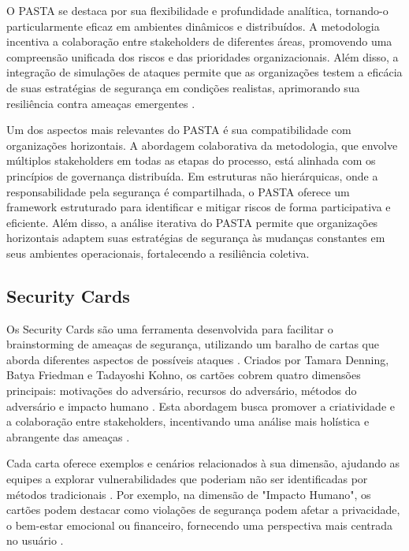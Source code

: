 O PASTA se destaca por sua flexibilidade e profundidade analítica,
tornando-o particularmente eficaz em ambientes dinâmicos e
distribuídos. A metodologia incentiva a colaboração entre stakeholders
de diferentes áreas, promovendo uma compreensão unificada dos riscos e
das prioridades organizacionais. Além disso, a integração de
simulações de ataques permite que as organizações testem a eficácia de
suas estratégias de segurança em condições realistas, aprimorando sua
resiliência contra ameaças emergentes
\cite{RiskCentricThreatModeling}.

Um dos aspectos mais relevantes do PASTA é sua compatibilidade com
organizações horizontais. A abordagem colaborativa da metodologia, que
envolve múltiplos stakeholders em todas as etapas do processo, está
alinhada com os princípios de governança distribuída. Em estruturas
não hierárquicas, onde a responsabilidade pela segurança é
compartilhada, o PASTA oferece um framework estruturado para
identificar e mitigar riscos de forma participativa e eficiente. Além
disso, a análise iterativa do PASTA permite que organizações
horizontais adaptem suas estratégias de segurança às mudanças
constantes em seus ambientes operacionais, fortalecendo a resiliência
coletiva.

\subsection{Security Cards}
\label{subsec:security_cards}

Os Security Cards são uma ferramenta desenvolvida para facilitar o
brainstorming de ameaças de segurança, utilizando um baralho de cartas
que aborda diferentes aspectos de possíveis ataques
\cite{SecurityCardsToolkit}. Criados por Tamara Denning, Batya
Friedman e Tadayoshi Kohno, os cartões cobrem quatro dimensões
principais: motivações do adversário, recursos do adversário, métodos
do adversário e impacto humano \cite{KeepingAheadofOurAdversaries}.
Esta abordagem busca promover a criatividade e a colaboração entre
stakeholders, incentivando uma análise mais holística e abrangente das
ameaças \cite{CyberThreatModeling}.

Cada carta oferece exemplos e cenários relacionados à sua dimensão,
ajudando as equipes a explorar vulnerabilidades que poderiam não ser
identificadas por métodos tradicionais \cite{SecurityCardsToolkit}.
Por exemplo, na dimensão de "Impacto Humano", os cartões podem
destacar como violações de segurança podem afetar a privacidade, o
bem-estar emocional ou financeiro, fornecendo uma perspectiva mais
centrada no usuário \cite{KeepingAheadofOurAdversaries}.

